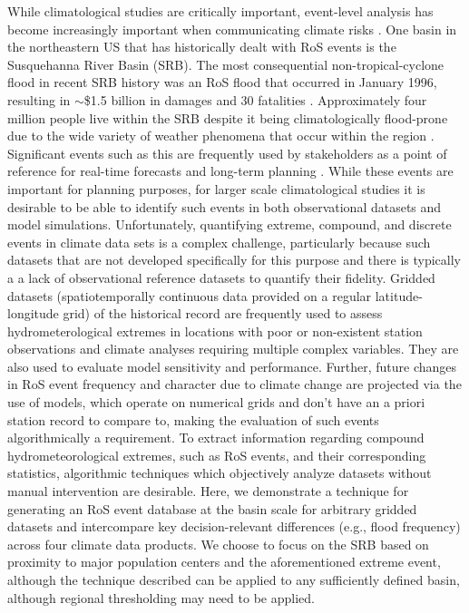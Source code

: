 \documentclass[nhess, manuscript]{copernicus}
\begin{document}
While climatological studies are critically important, event-level analysis has become increasingly important when communicating climate risks \citep{shepherd2018storylines}. 
One basin in the northeastern US that has historically dealt with RoS events is the Susquehanna River Basin (SRB). 
The most consequential non-tropical-cyclone flood in recent SRB history was an RoS flood that occurred in January 1996, resulting in $\sim$\$1.5 billion in damages and 30 fatalities \citep{leathers1998severe}. 
Approximately four million people live within the SRB \citep{leathers2008hydroclimatic} despite it being climatologically flood-prone due to the wide variety of weather phenomena that occur within the region \citep{perry2000significant}.
Significant events such as this are frequently used by stakeholders as a point of reference for real-time forecasts and long-term planning \citep{george2019the}. 
While these events are important for planning purposes, for larger scale climatological studies it is desirable to be able to identify such events in both observational datasets and model simulations.  Unfortunately,  quantifying extreme, compound, and discrete events in climate data sets is  a complex challenge, particularly because such  datasets that are not developed specifically for this purpose and there is typically a  a lack of observational reference datasets to quantify their fidelity. 
Gridded datasets (spatiotemporally continuous data provided on a regular latitude-longitude grid) of the historical record are frequently used to assess hydrometerological extremes in locations with poor or non-existent station observations and climate analyses requiring multiple complex variables.
They are also used to evaluate model sensitivity and performance. 
Further, future changes in RoS event frequency and character due to climate change are projected via the use of models, which operate on numerical grids and don't have an a priori station record to compare to, making the evaluation of such events algorithmically a requirement.
To extract information regarding compound hydrometeorological extremes, such as RoS events, and their corresponding statistics, algorithmic techniques which objectively analyze datasets without manual intervention are desirable.
Here, we demonstrate a technique for generating an RoS event database at the basin scale for arbitrary gridded datasets and intercompare key decision-relevant differences (e.g., flood frequency) across four climate data products. 
We choose to focus on the SRB based on proximity to major population centers and the aforementioned extreme event, although the technique described can be applied to any sufficiently defined basin, although regional thresholding may need to be applied.
\end{document}
